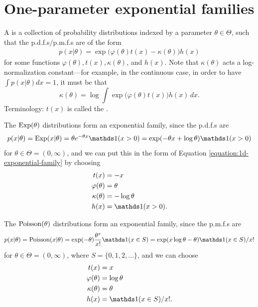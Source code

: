 \documentclass[12pt]{article}
\begin{document}
\section{One-parameter exponential families}

A  is a collection of probability distributions indexed by a parameter $\theta\in\Theta$, such that the p.d.f.s/p.m.f.s are of the form
\begin{align}\label{equation:1d-exponential-family}
p(x|\theta) =\exp\big(\varphi(\theta)t(x)-\kappa(\theta)\big) h(x)
\end{align}
for some functions $\varphi(\theta),t(x),\kappa(\theta)$, and $h(x)$. Note that $\kappa(\theta)$ acts a log-normalization constant---for example, in the continuous case, in order to have $\int p(x|\theta)d x = 1$, it must be that
$$\kappa(\theta) = \log \int \exp\big(\varphi(\theta)t(x)\big) h(x)\,d x.$$
Terminology: $t(x)$ is called the .

\begin{example}[Exponential]
The $\operatorname*{Exp}(\theta)$ distributions form an exponential family, since the p.d.f.s are
$$p(x|\theta) =\Exp(x|\theta) = \theta e^{-\theta x}\I(x>0) =\exp(-\theta x + \log\theta)\I(x>0)$$
for $\theta\in\Theta=(0,\infty)$, and we can put this in the form of Equation \ref{equation:1d-exponential-family} by choosing
\begin{align*}
t(x) &= -x \\
\varphi(\theta) & =\theta \\
\kappa(\theta) & = -\log\theta \\
h(x) &= \I(x>0).
\end{align*}
\end{example}

\begin{example}[Poisson]
The $\operatorname*{Poisson}(\theta)$ distributions form an exponential family, since the p.m.f.s are
$$p(x|\theta) = \Poisson(x|\theta)= \exp(-\theta)\frac{\theta^x}{x!}\I(x\in S) 
= \exp(x\log\theta - \theta)\I(x\in S)/x!$$
for $\theta\in\Theta=(0,\infty)$, where $S=\{0,1,2,\ldots\}$, and we can choose
\begin{align*}
t(x) &= x \\
\varphi(\theta) & = \log\theta \\
\kappa(\theta) & = \theta \\
h(x) & = \I(x\in S)/x!.
\end{align*}
\end{example}
\end{document}
